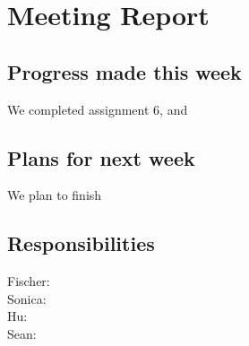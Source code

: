 \section{Meeting Report}

\subsection{Progress made this week}
We completed assignment 6, and 

\subsection{Plans for next week}
We plan to finish
 
\subsection{Responsibilities}
Fischer: \\
Sonica: \\
Hu: \\
Sean: \\
